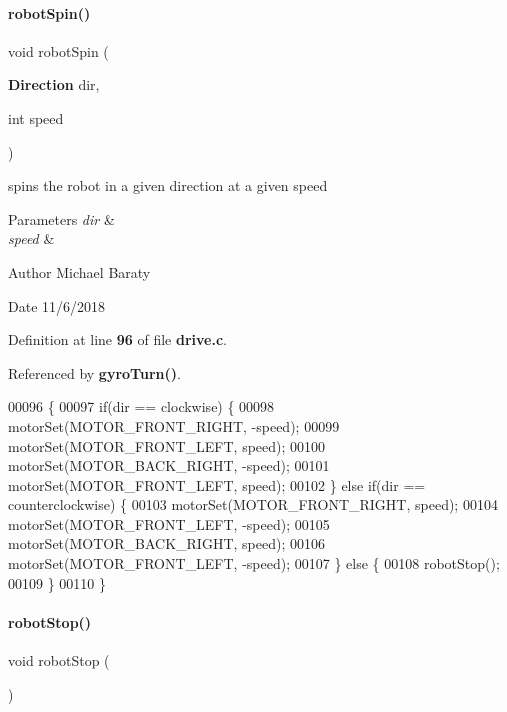 \paragraph{robot\+Spin()}
{\footnotesize\ttfamily void robot\+Spin (\begin{DoxyParamCaption}\item[{\textbf{ Direction}}]{dir,  }\item[{int}]{speed }\end{DoxyParamCaption})}



spins the robot in a given direction at a given speed 


\begin{DoxyParams}{Parameters}
{\em dir} & \\
\hline
{\em speed} & \\
\hline
\end{DoxyParams}
\begin{DoxyAuthor}{Author}
Michael Baraty 
\end{DoxyAuthor}
\begin{DoxyDate}{Date}
11/6/2018 
\end{DoxyDate}


Definition at line \textbf{ 96} of file \textbf{ drive.\+c}.



Referenced by \textbf{ gyro\+Turn()}.


\begin{DoxyCode}
00096                                          \{
00097   \textcolor{keywordflow}{if}(dir == clockwise) \{
00098     motorSet(MOTOR_FRONT_RIGHT, -speed);
00099     motorSet(MOTOR_FRONT_LEFT, speed);
00100     motorSet(MOTOR_BACK_RIGHT, -speed);
00101     motorSet(MOTOR_FRONT_LEFT, speed);
00102   \} \textcolor{keywordflow}{else} \textcolor{keywordflow}{if}(dir == counterclockwise) \{
00103     motorSet(MOTOR_FRONT_RIGHT, speed);
00104     motorSet(MOTOR_FRONT_LEFT, -speed);
00105     motorSet(MOTOR_BACK_RIGHT, speed);
00106     motorSet(MOTOR_FRONT_LEFT, -speed);
00107   \} \textcolor{keywordflow}{else} \{
00108     robotStop();
00109   \}
00110 \}
\end{DoxyCode}
\mbox{\label{drive_8h_a69f6d219d1eedd14cd191b0b201796df}} 
\paragraph{robot\+Stop()}
{\footnotesize\ttfamily void robot\+Stop (\begin{DoxyParamCaption}{ }\end{DoxyParamCaption})}



